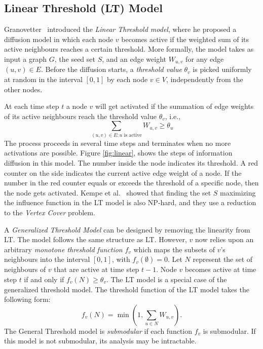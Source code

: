 \subsection{Linear Threshold (LT) Model} \label{sec:lt}

Granovetter~\cite{Granovetter1978} introduced the \emph{Linear Threshold model}, where he proposed a diffusion model in which each node $v$ becomes active if the weighted sum of its active neighbours reaches a certain threshold. More formally, the model takes as input a graph $G$, the seed set $S$, and an edge weight $W_{u,v}$ for any edge $(u,v)\in E$. Before the diffusion starts, a \emph{threshold value} $\theta_v$ is picked uniformly at random in the interval $[0,1]$ by each node $v\in V$, independently from the other nodes.

At each time step $t$ a node $v$ will get activated if the summation of edge weights of its active neighbours reach the threshold value $\theta_v$, i.e.,  
\begin{equation}
\sum_{(u,v)\in E: u\text{ is active}} W_{u,v}  \geq \theta_u
\end{equation}
The process proceeds in several time steps and terminates when no more activations are possible. Figure \ref{fig:linear}, shows the steps of information diffusion in this model. The number inside the node indicates its threshold. A red counter on the side indicates the current active edge weight of a node. If the number in the red counter equals or exceeds the threshold of a specific node, then the node gets activated. Kempe et al.~\cite{Kempe2015} showed that finding the set $S$ maximizing the influence function in the LT model is also NP-hard, and they use a reduction to the {\em Vertex Cover} problem.  

A \emph{Generalized Threshold Model} can be designed by removing the linearity from LT. The model follows the same structure as LT. However, $v$ now relies upon an arbitrary {\em monotone threshold function} $f_v$ which maps the subsets of $v$’s neighbours into the interval $[0,1]$, with $f_v(\emptyset) = 0$. Let $N$ represent the set of neighbours of $v$ that are active at time step $t-1$. Node $v$ becomes active at time step $t$ if and only if $f_v(N) \geq \theta_v$. The LT model is a special case of the generalized threshold model. The threshold function of the LT model takes the following form:
\begin{equation}
f_v(N) = \min\left(1, \sum_{u \in N} W_{u,v}\right).
\end{equation}
The General Threshold model is {\em submodular} if each function $f_v$ is submodular. If this model is not submodular, its analysis may be intractable. 

